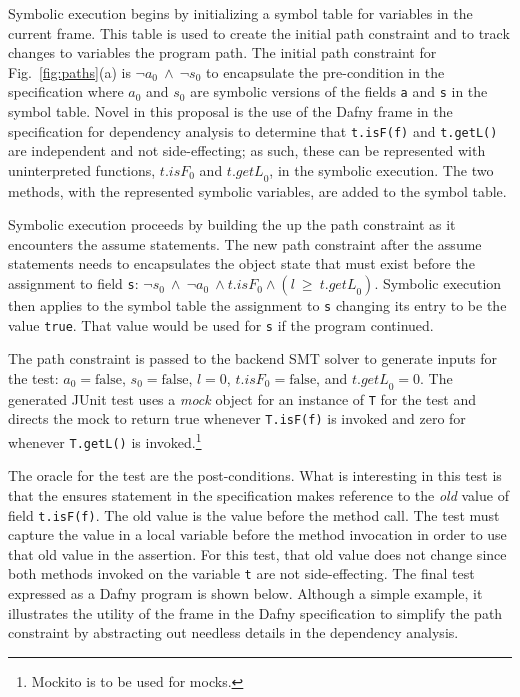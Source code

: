 \documentclass[11pt,onecolumn,notitlepage]{article}
\newcommand{\figref}[1]{Fig.~\ref{#1}}
\begin{document}
Symbolic execution begins by initializing a symbol table for variables in the current frame. This table is used to create the initial path constraint and to track changes to variables the program path. The initial path constraint for \figref{fig:paths}(a) is $\neg a_0\ \wedge\ \neg s_0$ to encapsulate the pre-condition in the specification where $a_0$ and $s_0$ are symbolic versions of the fields \texttt{a} and \texttt{s} in the symbol table. Novel in this proposal is the use of the Dafny frame in the specification for dependency analysis to determine that \texttt{t.isF(f)} and \texttt{t.getL()} are independent and not side-effecting; as such, these can be represented with uninterpreted functions, $\mathit{t.isF}_0$ and $\mathit{t.getL}_0$, in the symbolic execution. The two methods, with the represented symbolic variables, are added to the symbol table.

Symbolic execution proceeds by building the up the path constraint as it encounters the assume statements. The new path constraint after the assume statements needs to encapsulates the object state that must exist before the assignment to field \texttt{s}: $\neg s_0\ \wedge\ \neg a_0\ \wedge \mathit{t.isF}_0 \wedge (l\ \ge\ \mathit{t.getL}_0)$. Symbolic execution then applies to the symbol table the assignment to \texttt{s} changing its entry to be the value \texttt{true}. That value would be used for \texttt{s} if the program continued.

The path constraint is passed to the backend SMT solver to generate inputs for the test: $a_0 = \mathrm{false}$, $s_0 = \mathrm{false}$, $\mathit{l} = 0$, $\mathit{t.isF}_0 = \mathrm{false}$, and $\mathit{t.getL}_0 = 0$. The generated JUnit test uses a \emph{mock} object for an instance of \texttt{T} for the test and directs the mock to return true whenever \texttt{T.isF(f)} is invoked and zero for whenever \texttt{T.getL()} is invoked.\footnote{Mockito is to be used for mocks.} 

The oracle for the test are the post-conditions. What is interesting in this test is that the ensures statement in the specification makes reference to the \emph{old} value of field \texttt{t.isF(f)}. The old value is the value before the method call. The test must capture the value in a local variable before the method invocation in order to use that old value in the assertion. For this test, that old value does not change since both methods invoked on the variable \texttt{t} are not side-effecting. The final test expressed as a Dafny program is shown below. Although a simple example, it illustrates the utility of the frame in the Dafny specification to simplify the path constraint by abstracting out needless details in the dependency analysis.
\end{document}
